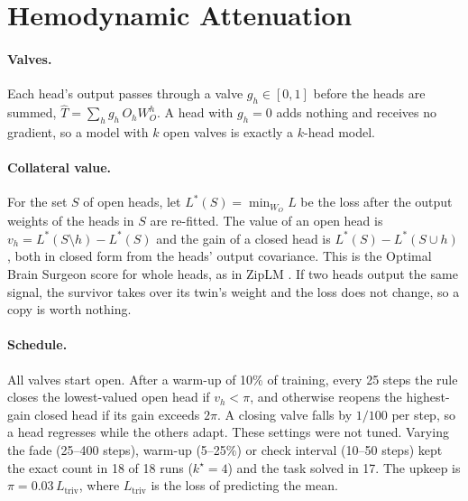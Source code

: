\documentclass[letterpaper]{article} %
\newcommand{\Ltriv}{L_{\mathrm{triv}}}
\newcommand{\kstar}{k^\star}
\begin{document}
\section{Hemodynamic Attenuation}

\paragraph{Valves.} Each head's output passes through a valve $g_h\in[0,1]$ before the heads are summed, $\hat{T}=\sum_h g_h\, O_h W_O^h$. A head with $g_h=0$ adds nothing and receives no gradient, so a model with $k$ open valves is exactly a $k$-head model.

\paragraph{Collateral value.} For the set $S$ of open heads, let $L^\ast(S)=\min_{W_O} L$ be the loss after the output weights of the heads in $S$ are re-fitted. The value of an open head is $v_h=L^\ast(S\setminus h)-L^\ast(S)$ and the gain of a closed head is $L^\ast(S)-L^\ast(S\cup h)$, both in closed form from the heads' output covariance. This is the Optimal Brain Surgeon score \citep{obs} for whole heads, as in ZipLM \citep{ziplm}. If two heads output the same signal, the survivor takes over its twin's weight and the loss does not change, so a copy is worth nothing.

\paragraph{Schedule.} All valves start open. After a warm-up of 10\% of training, every 25 steps the rule closes the lowest-valued open head if $v_h<\pi$, and otherwise reopens the highest-gain closed head if its gain exceeds $2\pi$. A closing valve falls by $1/100$ per step, so a head regresses while the others adapt. These settings were not tuned. Varying the fade (25--400 steps), warm-up (5--25\%) or check interval (10--50 steps) kept the exact count in 18 of 18 runs ($\kstar=4$) and the task solved in 17. The upkeep is $\pi=0.03\,\Ltriv$, where $\Ltriv$ is the loss of predicting the mean.
\end{document}
